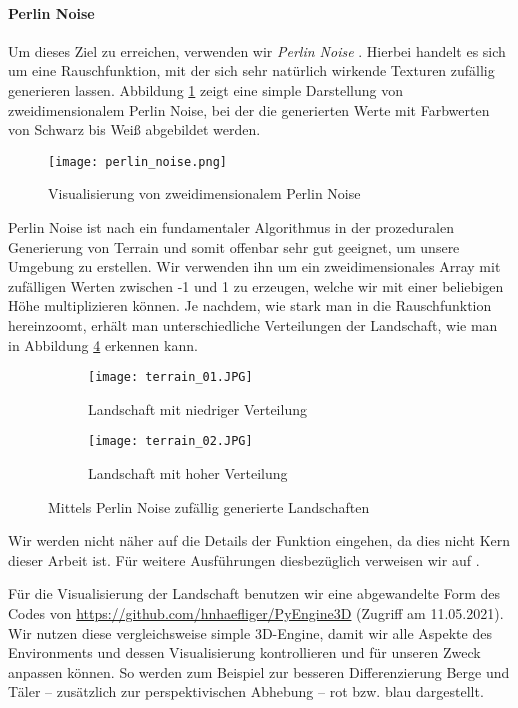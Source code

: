 \paragraph{Perlin Noise}
Um dieses Ziel zu erreichen, verwenden wir \textit{Perlin Noise} \cite{parberry2015modeling}. Hierbei handelt es sich um eine Rauschfunktion, mit der sich sehr natürlich wirkende Texturen zufällig generieren lassen. Abbildung \ref{img:perlinNoise} zeigt eine simple Darstellung von zweidimensionalem Perlin Noise, bei der die generierten Werte mit Farbwerten von Schwarz bis Weiß abgebildet werden.
\begin{figure}[h!]
    \centering
    \texttt{[image: perlin\_noise.png]}
    \caption{Visualisierung von zweidimensionalem Perlin Noise} \label{img:perlinNoise}
\end{figure}
Perlin Noise ist nach \cite{parberry2015modeling} ein fundamentaler Algorithmus in der prozeduralen Generierung von Terrain und somit offenbar sehr gut geeignet, um unsere Umgebung zu erstellen. Wir verwenden ihn um ein zweidimensionales Array mit zufälligen Werten zwischen -1 und 1 zu erzeugen, welche wir mit einer beliebigen Höhe multiplizieren können. Je nachdem, wie stark man in die Rauschfunktion \glqq hereinzoomt\grqq{}, erhält man unterschiedliche Verteilungen der Landschaft, wie man in Abbildung \ref{img:randomTerrain} erkennen kann.
\begin{figure}[h!]
    \centering
    \begin{subfigure}[b]{0.49\textwidth}
        \texttt{[image: terrain\_01.JPG]}
        \caption{Landschaft mit niedriger Verteilung}
        \label{img:randomTerrainA}
    \end{subfigure}
    \begin{subfigure}[b]{0.49\textwidth}
        \texttt{[image: terrain\_02.JPG]}
        \caption{Landschaft mit hoher Verteilung}
        \label{img:randomTerrainB}
    \end{subfigure}
    \caption{Mittels Perlin Noise zufällig generierte Landschaften}
    \label{img:randomTerrain}
\end{figure}
Wir werden nicht näher auf die Details der Funktion eingehen, da dies nicht Kern dieser Arbeit ist. Für weitere Ausführungen diesbezüglich verweisen wir auf \cite{archer2011procedurally}.

Für die Visualisierung der Landschaft benutzen wir eine abgewandelte Form des Codes von \url{https://github.com/hnhaefliger/PyEngine3D} (Zugriff am 11.05.2021). Wir nutzen diese vergleichsweise simple 3D-Engine, damit wir alle Aspekte des Environments und dessen Visualisierung kontrollieren und für unseren Zweck anpassen können. So werden zum Beispiel zur besseren Differenzierung Berge und Täler -- zusätzlich zur perspektivischen Abhebung -- rot bzw. blau dargestellt.

